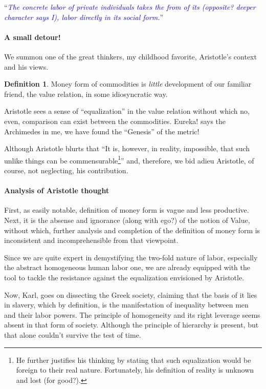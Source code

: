 \documentclass[12pt]{extarticle}
\theoremstyle{definition}
\newtheorem{definition}{Definition}[section]
\begin{document}
``\emph{\textcolor{blue}{The concrete labor of private individuals takes the from of its (opposite? deeper character says I), labor directly in its social form.}}''

\paragraph{A small detour!}
We summon one of the great thinkers, my childhood favorite, Aristotle's context and his views.
\begin{definition}
  \label{def:moneyAris}
  Money form of commodities is \emph{little} development of our familiar friend, the value relation, in some idiosyncratic way.
\end{definition}

Aristotle sees a sense of ``equalization'' in the value relation without which no, even, comparison can exist between the commodities.  Eureka! says the Archimedes in me, we have found the ``Genesis'' of the metric!

Although Aristotle blurts that ``It is, however, in reality, impossible, that such unlike things can be commensurable\footnote{He further justifies his thinking by stating that such equalization would be foreign to their real nature.  Fortunately, his definition of reality is unknown and lost (for good?).}'' and, therefore, we bid adieu Aristotle, of course, not neglecting, his contribution.

\paragraph{Analysis of Aristotle thought}
First, as easily notable, definition of money form is vague and less productive.  Next, it is the absense and ignorance (along with ego?) of the notion of Value, without which, further analysis and completion of the definition of money form is inconsistent and incomprehensible from that viewpoint.

Since we are quite expert in demystifying the two-fold nature of labor, especially the abstract homogeneous human labor one, we are already equipped with the tool to tackle the resistance against the equalization envisioned by Aristotle.

Now, Karl, goes on dissecting the Greek society, claiming that the basis of it lies in slavery, which by definition, is the manifestation of inequality between men and their labor powers.  The principle of homogeneity and its right leverage seems absent in that form of society.  Although the principle of hierarchy is present, but that alone couldn't survive the test of time.
\end{document}
